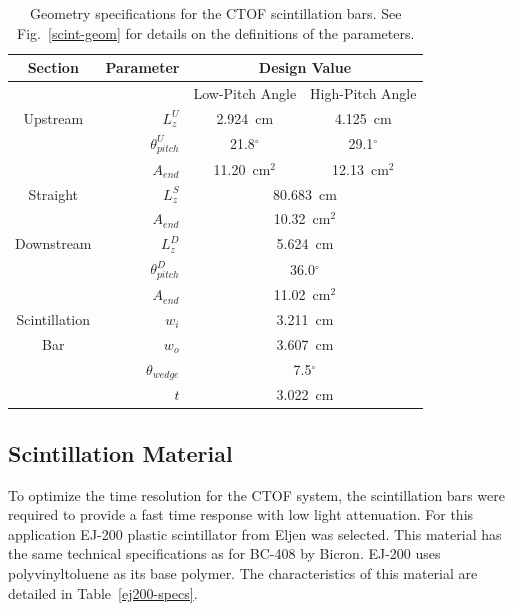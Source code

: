 \documentclass[3p,times,twocolumn]{elsarticle}
\begin{document}
\begin{table}[ht]
\begin{center}
\begin{tabular} {c|r|cc} \hline
Section       & Parameter          & \multicolumn{2}{c}{Design Value} \\ \hline
              &                    & Low-Pitch Angle & High-Pitch Angle \\ \cline{3-4}
Upstream      & $L_z^U$            & 2.924~cm  & 4.125~cm	  \\
              & $\theta_{pitch}^U$ & 21.8$^\circ$ & 29.1$^\circ$ \\
              & $A_{end}$          & 11.20~cm$^2$ & 12.13~cm$^2$ \\ \hline
Straight      & $L_z^S$            & \multicolumn{2}{c}{80.683~cm}    \\
              & $A_{end}$          & \multicolumn{2}{c}{10.32~cm$^2$} \\ \hline
Downstream    & $L_z^D$            & \multicolumn{2}{c}{5.624~cm}     \\
              & $\theta_{pitch}^D$ & \multicolumn{2}{c}{36.0$^\circ$} \\
              & $A_{end}$          & \multicolumn{2}{c}{11.02~cm$^2$} \\ \hline
Scintillation & $w_i$              & \multicolumn{2}{c}{3.211~cm}     \\ 
Bar           & $w_o$              & \multicolumn{2}{c}{3.607~cm}     \\  
              & $\theta_{wedge}$   & \multicolumn{2}{c}{7.5$^\circ$}  \\ 
              & $t$                & \multicolumn{2}{c}{3.022~cm}  \\ \hline   
\end{tabular}
\end{center}
\caption{Geometry specifications for the CTOF scintillation bars. See Fig.~\ref{scint-geom} for
details on the definitions of the parameters.}
\label{bar-geom}
\end{table}

\subsection{Scintillation Material}
\label{scint-mat}

To optimize the time resolution for the CTOF system, the scintillation bars were required to provide a
fast time response with low light attenuation. For this application EJ-200 plastic scintillator from Eljen
was selected. This material has the same technical specifications as for BC-408 by Bicron. EJ-200 uses
polyvinyltoluene as its base polymer. The characteristics of this material are detailed in
Table~\ref{ej200-specs}.
\end{document}
